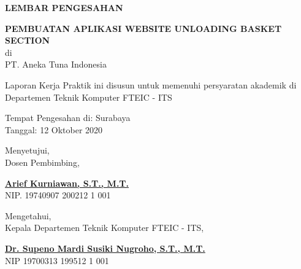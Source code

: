 \begin{center}
  {\Large \textbf{LEMBAR PENGESAHAN}}
  \vspace{4ex}


  {\large \textbf{PEMBUATAN APLIKASI WEBSITE UNLOADING BASKET SECTION}} \\
  di \\
  PT. Aneka Tuna Indonesia
  \vspace{4ex}

  Laporan Kerja Praktik ini disusun untuk memenuhi persyaratan akademik di Departemen Teknik Komputer FTEIC - ITS
  \vspace{2ex}

  Tempat Pengesahan di: Surabaya \\
  Tanggal: 12 Oktober 2020
  \vspace{8ex}

  Menyetujui, \\
  Dosen Pembimbing,
  \vspace{12ex}

  \textbf{\underline{Arief Kurniawan, S.T., M.T.}} \\
  NIP. 19740907 200212 1 001
  \vspace{8ex}

  Mengetahui, \\
  Kepala Departemen Teknik Komputer FTEIC - ITS,
  \vspace{12ex}

  \textbf{\underline{Dr. Supeno Mardi Susiki Nugroho, S.T., M.T.}} \\
  NIP 19700313 199512 1 001

\end{center}
